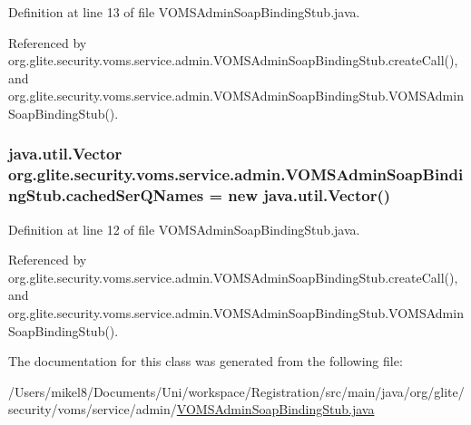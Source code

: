 Definition at line 13 of file VOMSAdminSoapBindingStub.java.



Referenced by org.glite.security.voms.service.admin.VOMSAdminSoapBindingStub.createCall(), and org.glite.security.voms.service.admin.VOMSAdminSoapBindingStub.VOMSAdminSoapBindingStub().

\hypertarget{classorg_1_1glite_1_1security_1_1voms_1_1service_1_1admin_1_1VOMSAdminSoapBindingStub_ad7b8645e836d36f413ffb23ca34e3c5d}{
\subsubsection[{cachedSerQNames}]{\setlength{\rightskip}{0pt plus 5cm}java.util.Vector {\bf org.glite.security.voms.service.admin.VOMSAdminSoapBindingStub.cachedSerQNames} = new java.util.Vector()}}
\label{classorg_1_1glite_1_1security_1_1voms_1_1service_1_1admin_1_1VOMSAdminSoapBindingStub_ad7b8645e836d36f413ffb23ca34e3c5d}


Definition at line 12 of file VOMSAdminSoapBindingStub.java.



Referenced by org.glite.security.voms.service.admin.VOMSAdminSoapBindingStub.createCall(), and org.glite.security.voms.service.admin.VOMSAdminSoapBindingStub.VOMSAdminSoapBindingStub().



The documentation for this class was generated from the following file:\begin{DoxyCompactItemize}
\item 
/Users/mikel8/Documents/Uni/workspace/Registration/src/main/java/org/glite/security/voms/service/admin/\hyperlink{VOMSAdminSoapBindingStub_8java}{VOMSAdminSoapBindingStub.java}\end{DoxyCompactItemize}
